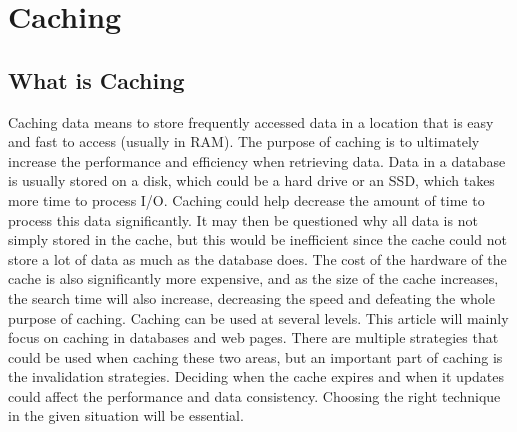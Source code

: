 \chapter{Caching}\label{chap:caching}

\section[What is Caching]{What is Caching}
Caching data means to store frequently accessed data in a location that is easy and fast to access (usually in RAM). 
The purpose of caching is to ultimately increase the performance and efficiency when retrieving data. 
Data in a database is usually stored on a disk, which could be a hard drive or an SSD, which takes more time to process I/O. 
Caching could help decrease the amount of time to process this data significantly. It may then be questioned why all data is not simply stored in the cache, 
but this would be inefficient since the cache could not store a lot of data as much as the database does. The cost of the hardware of the cache is also significantly more expensive, 
and as the size of the cache increases, the search time will also increase, decreasing the speed and defeating the whole purpose of caching. 
Caching can be used at several levels. This article will mainly focus on caching in databases and web pages. 
There are multiple strategies that could be used when caching these two areas, but an important part of caching is the invalidation strategies. 
Deciding when the cache expires and when it updates could affect the performance and data consistency. Choosing the right technique in the given situation will be essential.





